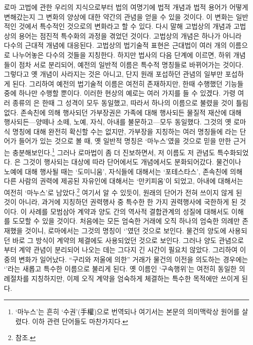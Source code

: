 로마 고법에 관한 우리의 지식으로부터
법의 여명기에 법적 개념과 법적 용어가 어떻게 변해갔는지
그 변화의 양상에 대한 약간의 관념을 얻을 수 있을 것이다.
이 변화는 일반적인 것에서 특수적인 것으로의 변화라고 할 수 있다.
다시 말해 고법상의 개념과 고법상의 용어는 점진적 특수화의 과정을
겪었던 것이다.
고법상의 개념은 하나가 아니라 다수의 근대적 개념에 대응된다.
고법상의 법기술적 표현은 근대법이 여러 개의 이름으로 나누어놓은
다수의 것들을 지칭한다.
하지만 법사의 다음 단계에 이르면,
하위 개념들이 점차 서로 분리되어,
예전의 일반적 이름은 특수적 명칭들로 바뀌어가는 것이다.
그렇다고 옛 개념이 사라지는 것은 아니고,
단지 원래 포섭하던 관념의 일부만 포섭하게 된다.
그리하여 예전의 법기술적 이름은 여전히 존재하지만,
한때 수행했던 기능들 중에 하나만 수행할 뿐이다.
이러한 현상의 예로는 여러 가지를 들 수 있겠다.
가령 여러 종류의 은 한때
그 성격이 모두 동일했고,
따라서 하나의 이름으로 불렸을 것이 틀림없다.
존속친에 의해 행사되던 가부장권은
가족에 대해 행사되든 물질적 재산에 대해 행사되든---양떼나 소떼, 노예,
자식, 아내를 불문하고---모두 동일했다.
그것의 옛 로마식 명칭에 대해 완전히 확신할 수는 없지만,
가부장을 지칭하는 여러 명칭들에
라는 단어가 들어가 있는 것으로 볼 때,
옛 일반적 명칭은 `마누스'였을 것으로 믿을 만한 근거는 충분해보인다.\footnote{%
  `마누스'는 흔히 `수권'(手權)으로 번역되나 여기서는 본문의 의미맥락상
  원어를 살렸다.
  이하 관련 단어들도 마찬가지다.
}
그러나 로마법이 좀 더 진보하면서,
저 이름도 저 관념도 특수화되었다.
은
그것이 행사되는 대상에 따라
단어에서도 개념에서도 분화되어갔다.
물건이나 노예에 대해 행사될 때는
`도미니움',
자식들에 대해서는 `포테스타스',
존속친에 의해 다른 사람의 권력에 제공된 자유인에 대해서는
`만키피움'이 되었고,
아내에 대해서는 여전히 `마누스'로 남았다.\footnote{%
   참조. }
여기서 알 수 있듯이,
원래의 단어가 전혀 쓰이지 않게 된 것이 아니라,
과거에 지칭하던 권력행사 중 특수한 한 가지 권력행사에 국한하게 된 것이다.
이 사례를 모범삼아 계약과 양도 간의 역사적 결합관계의 성질에 대해서도
이해를 도모할 수 있을 것이다.
처음에는 모든 엄숙한 거래에 오직 하나의 엄숙한 의례만
존재했을 것이니,
로마에서는 그것의 명칭이 `'였던 것으로 보인다.
물건의 양도에 사용되던 바로 그 방식이
계약의 체결에도 사용되었던 것으로 보인다.
그러나 양도 관념으로부터 계약 관념이 분리되어 나오는 데는
그다지 긴 시간이 필요치 않았다.
그리하여 이중의 변화가 일어났다.
``구리와 저울에 의한'' 거래가
물건의 이전을 의도하는 경우에는
`'라는 새롭고 특수한 이름으로 불리게 된다.
옛 이름인 `구속행위'는 여전히 동일한 의례절차를 지칭하지만,
이제
오직 계약을 엄숙하게 체결하는 특수한 목적에만 쓰이게 된다.

